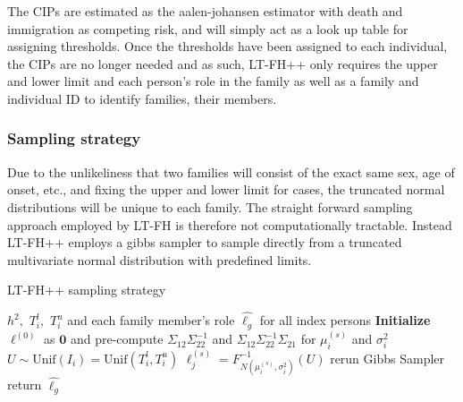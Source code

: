 The CIPs are estimated as the aalen-johansen estimator with death and immigration as competing risk, and will simply act as a look up table for assigning thresholds. Once the thresholds have been assigned to each individual, the CIPs are no longer needed and as such, LT-FH++ only requires the upper and lower limit and each person's role in the family as well as a family and individual ID to identify families, their members. 

\subsubsection{Sampling strategy}

Due to the unlikeliness that two families will consist of the exact same sex, age of onset, etc., and fixing the upper and lower limit for cases, the truncated normal distributions will be unique to each family. The straight forward sampling approach employed by LT-FH is therefore not computationally tractable. Instead LT-FH++ employs a gibbs sampler to sample directly from a truncated multivariate normal distribution with predefined limits. 


\begin{algorithm}
\caption{LT-FH++ sampling strategy}
\begin{algorithmic}[1]
\INPUT $ h^2,$ $T_{i}^l,$ $T_{i}^u$ and each family member's role 
\OUTPUT $ \hat{\ell_g} $ for all index persons
\GIBBS
\STATE \textbf{Initialize} $\ell^{(0)}$ as $ \mathbf{0} $ and pre-compute $ \Sigma_{12} \Sigma_{22}^{-1} $ and $ \Sigma_{12} \Sigma_{22}^{-1} \Sigma_{21} $ for $ \mu_i^{(s)} $ and $ \sigma^2_i $
	  
	\STATE $ U \sim \text{Unif}(I_i) = \text{Unif}(T_i^l, T_i^u) $ 
	\STATE $ \ell_j^{(s)} = F^{-1}_{N(\mu_i^{(s)}, \sigma_i^2)}(U) $
	\ENDFOR
\ENDFOR
{}
\STATE rerun Gibbs Sampler
\ELSE
\STATE return  $ \hat{\ell_g} $
\ENDIF
\end{algorithmic}
\end{algorithm}


